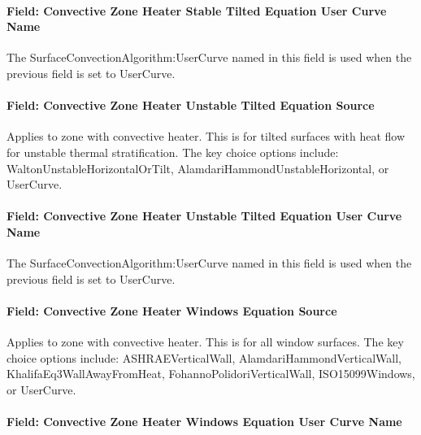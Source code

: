 \paragraph{Field: Convective Zone Heater Stable Tilted Equation User Curve Name}\label{field-convective-zone-heater-stable-tilted-equation-user-curve-name}

The SurfaceConvectionAlgorithm:UserCurve named in this field is used when the previous field is set to UserCurve.

\paragraph{Field: Convective Zone Heater Unstable Tilted Equation Source}\label{field-convective-zone-heater-unstable-tilted-equation-source}

Applies to zone with convective heater. This is for tilted surfaces with heat flow for unstable thermal stratification. The key choice options include: WaltonUnstableHorizontalOrTilt, AlamdariHammondUnstableHorizontal, or UserCurve.

\paragraph{Field: Convective Zone Heater Unstable Tilted Equation User Curve Name}\label{field-convective-zone-heater-unstable-tilted-equation-user-curve-name}

The SurfaceConvectionAlgorithm:UserCurve named in this field is used when the previous field is set to UserCurve.

\paragraph{Field: Convective Zone Heater Windows Equation Source}\label{field-convective-zone-heater-windows-equation-source}

Applies to zone with convective heater. This is for all window surfaces. The key choice options include: ASHRAEVerticalWall, AlamdariHammondVerticalWall, KhalifaEq3WallAwayFromHeat, FohannoPolidoriVerticalWall, ISO15099Windows, or UserCurve.

\paragraph{Field: Convective Zone Heater Windows Equation User Curve Name}\label{field-convective-zone-heater-windows-equation-user-curve-name}

